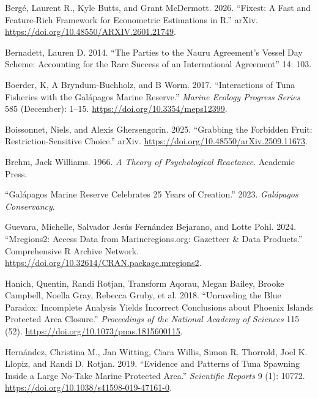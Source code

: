 \documentclass[
  letterpaper,
  DIV=11,
  numbers=noendperiod]{scrartcl}
\newlength{\cslhangindent}
\newenvironment{CSLReferences}[2] %
 {\begin{list}{}{%
  \setlength{\itemindent}{0pt}
  \setlength{\leftmargin}{0pt}
  \setlength{\parsep}{0pt}
  \ifodd #1
   \setlength{\leftmargin}{\cslhangindent}
   \setlength{\itemindent}{-1\cslhangindent}
  \fi
  \setlength{\itemsep}{#2\baselineskip}}}
 {\end{list}}
\begin{document}
\label{refs}
\begin{CSLReferences}{1}{0}
Bergé, Laurent R., Kyle Butts, and Grant McDermott. 2026. {``Fixest: {A}
Fast and Feature-Rich Framework for Econometric Estimations in {R}.''}
arXiv. \url{https://doi.org/10.48550/ARXIV.2601.21749}.

Bernadett, Lauren D. 2014. {``The {Parties} to the {Nauru Agreement}'s
{Vessel Day Scheme}: {Accounting} for the {Rare Success} of an
{International Agreement}''} 14: 103.

Boerder, K, A Bryndum-Buchholz, and B Worm. 2017. {``Interactions of
Tuna Fisheries with the {Galápagos} Marine Reserve.''} \emph{Marine
Ecology Progress Series} 585 (December): 1--15.
\url{https://doi.org/10.3354/meps12399}.

Boissonnet, Niels, and Alexis Ghersengorin. 2025. {``Grabbing the
{Forbidden Fruit}: {Restriction-Sensitive Choice}.''} arXiv.
\url{https://doi.org/10.48550/arXiv.2509.11673}.

Brehm, Jack Williams. 1966. \emph{A {Theory} of {Psychological
Reactance}}. Academic Press.

{``Galápagos {Marine Reserve Celebrates} 25 {Years} of {Creation}.''}
2023. \emph{Galápagos Conservancy}.

Guevara, Michelle, Salvador Jesús Fernández Bejarano, and Lotte Pohl.
2024. {``Mregions2: {Access Data} from {Marineregions}.org: {Gazetteer}
\& {Data Products}.''} Comprehensive R Archive Network.
\url{https://doi.org/10.32614/CRAN.package.mregions2}.

Hanich, Quentin, Randi Rotjan, Transform Aqorau, Megan Bailey, Brooke
Campbell, Noella Gray, Rebecca Gruby, et al. 2018. {``Unraveling the
Blue Paradox: {Incomplete} Analysis Yields Incorrect Conclusions about
{Phoenix Islands Protected Area} Closure.''} \emph{Proceedings of the
National Academy of Sciences} 115 (52).
\url{https://doi.org/10.1073/pnas.1815600115}.

Hernández, Christina M., Jan Witting, Ciara Willis, Simon R. Thorrold,
Joel K. Llopiz, and Randi D. Rotjan. 2019. {``Evidence and Patterns of
Tuna Spawning Inside a Large No-Take {Marine Protected Area}.''}
\emph{Scientific Reports} 9 (1): 10772.
\url{https://doi.org/10.1038/s41598-019-47161-0}.


\end{CSLReferences}
\end{document}

